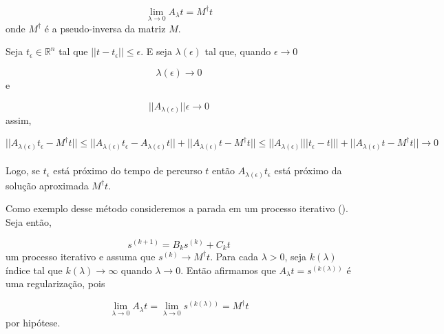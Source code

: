 \documentclass[a4paper, 12 pt]{article} %
\begin{document}
\begin{equation}\label{eq:regularization_limite}
\lim_{\lambda \rightarrow 0} A_{\lambda}t = M^{\dagger}t
\end{equation}
onde $M^{\dagger}$ é a pseudo-inversa da matriz $M$.

Seja $t_{\epsilon} \in \mathbb{R}^{n}$ tal que $||t - t_{\epsilon}|| \leq \epsilon$. E seja $\lambda (\epsilon)$ tal que, quando $\epsilon \rightarrow 0$ 

\begin{equation}\label{eq:regularization_lim}
\lambda (\epsilon)  \rightarrow 0
\end{equation}
e

\begin{equation}\label{eq:regularization_codition}
||A_{\lambda (\epsilon)}||\epsilon \rightarrow 0
\end{equation}
assim,

\begin{equation}\label{eq:regularization_formulation}
||A_{\lambda (\epsilon)}t_{\epsilon} - M^{\dagger}t|| \leq ||A_{\lambda (\epsilon)}t_{\epsilon} - A_{\lambda (\epsilon)}t|| + ||A_{\lambda (\epsilon)}t - M^{\dagger}t|| \leq ||A_{\lambda (\epsilon)}|||t_{\epsilon} - t||| + ||A_{\lambda (\epsilon)}t - M^{\dagger}t|| \longrightarrow 0
\end{equation} \\

Logo, se $t_{\epsilon}$ está próximo do tempo de percurso $t$ então $A_{\lambda (\epsilon)}t_{\epsilon}$ está próximo
da solução aproximada $M^{\dagger}t$.

Como exemplo desse método consideremos a parada em um processo iterativo (\citealp{tempopercurso}). Seja então,

\begin{equation}\label{eq:regularization_formulation_exemplo}
s^{(k + 1)} = B_{k}s^{(k)} + C_{k}t
\end{equation}
um processo iterativo e assuma que $s^{(k)} \rightarrow M^{\dagger}t$. Para cada $\lambda > 0$, seja $k(\lambda)$ índice tal que $k(\lambda) \rightarrow \infty$ quando $\lambda \rightarrow 0$. Então afirmamos que $A_{\lambda}t = s^{(k(\lambda))}$ é uma regularização, pois

\begin{equation}\label{eq:regularization_formulation_exemplo2}
\lim_{\lambda \rightarrow 0} A_{\lambda}t = \lim_{\lambda \rightarrow 0} s^{(k(\lambda))} = M^{\dagger}t
\end{equation}
por hipótese.
\end{document}
